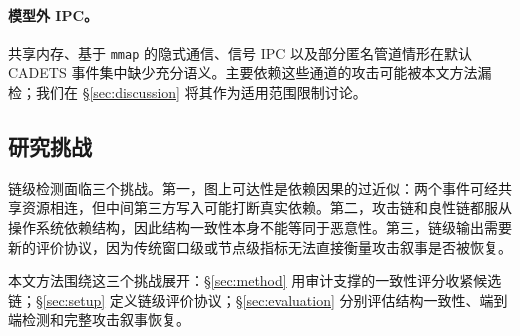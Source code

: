 \paragraph{模型外 IPC。}
\label{sec:audit_shm}
共享内存、基于 \texttt{mmap} 的隐式通信、信号 IPC 以及部分匿名管道情形在默认 CADETS 事件集中缺少充分语义。主要依赖这些通道的攻击可能被本文方法漏检；我们在 \S\ref{sec:discussion} 将其作为适用范围限制讨论。

\subsection{研究挑战}

链级检测面临三个挑战。第一，图上可达性是依赖因果的过近似：两个事件可经共享资源相连，但中间第三方写入可能打断真实依赖。第二，攻击链和良性链都服从操作系统依赖结构，因此结构一致性本身不能等同于恶意性。第三，链级输出需要新的评价协议，因为传统窗口级或节点级指标无法直接衡量攻击叙事是否被恢复。

本文方法围绕这三个挑战展开：\S\ref{sec:method} 用审计支撑的一致性评分收紧候选链；\S\ref{sec:setup} 定义链级评价协议；\S\ref{sec:evaluation} 分别评估结构一致性、端到端检测和完整攻击叙事恢复。
